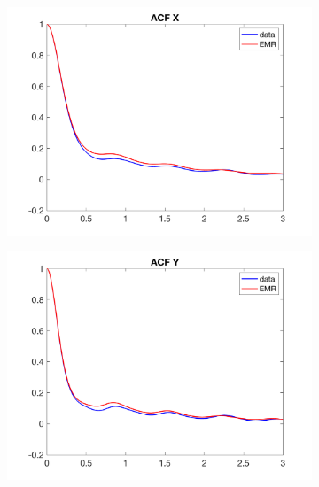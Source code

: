 \documentclass[12pt]{article}
\begin{document}
\begin{figure}[H]
	\centering
	\begin{subfigure}[b]{0.3\textwidth}
		\centering
		\includegraphics[width=\textwidth]{plots/l63/acfxl63.png}
	\end{subfigure}
	\hfill
	\begin{subfigure}[b]{0.3\textwidth}
		\centering
		\includegraphics[width=\textwidth]{plots/l63/acfyl63.png}
	\end{subfigure}
	\hfill
	\begin{subfigure}[b]{0.3\textwidth}
		\centering

\end{subfigure}
\end{figure}
\end{document}
